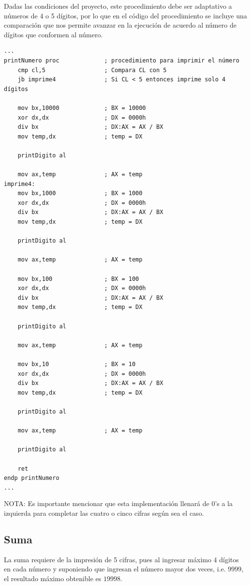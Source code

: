 \documentclass[letter,12 pt,titlepage]{article}
\begin{document}
    Dadas las condiciones del proyecto, este procedimiento debe ser adaptativo a números de 4 o 5 dígitos, por lo que en el código del procedimiento se incluye una comparación que nos permite avanzar en la ejecución de acuerdo al número de dígitos que conformen al número.

\begin{verbatim}
...
printNumero proc             ; procedimiento para imprimir el número
    cmp cl,5                 ; Compara CL con 5
    jb imprime4              ; Si CL < 5 entonces imprime solo 4 dígitos

    mov bx,10000             ; BX = 10000
    xor dx,dx                ; DX = 0000h
    div bx                   ; DX:AX = AX / BX
    mov temp,dx              ; temp = DX

    printDigito al

    mov ax,temp              ; AX = temp
imprime4:
    mov bx,1000              ; BX = 1000
    xor dx,dx                ; DX = 0000h
    div bx                   ; DX:AX = AX / BX
    mov temp,dx              ; temp = DX

    printDigito al

    mov ax,temp              ; AX = temp

    mov bx,100               ; BX = 100
    xor dx,dx                ; DX = 0000h
    div bx                   ; DX:AX = AX / BX
    mov temp,dx              ; temp = DX

    printDigito al

    mov ax,temp              ; AX = temp

    mov bx,10                ; BX = 10
    xor dx,dx                ; DX = 0000h
    div bx                   ; DX:AX = AX / BX
    mov temp,dx              ; temp = DX

    printDigito al

    mov ax,temp              ; AX = temp

    printDigito al

    ret
endp printNumero
...
\end{verbatim}

    NOTA: Es importante mencionar que esta implementación llenará de 0's a la izquierda para completar las cuatro o cinco cifras según sea el caso.

    \subsection{Suma}
    La suma requiere de la impresión de 5 cifras, pues al ingresar máximo 4 dígitos en cada número y suponiendo que ingresan el número mayor dos veces, i.e. $9999$, el resultado máximo obtenible es $19998$.
\end{document}
